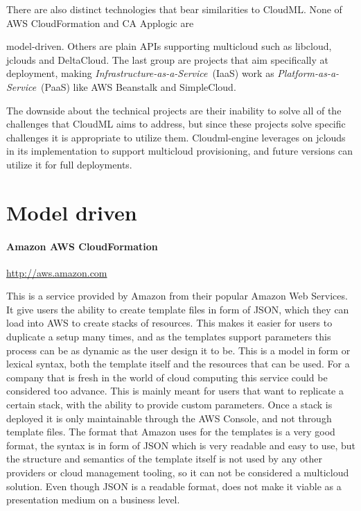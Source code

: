 There are also distinct technologies that bear similarities to CloudML.
None of AWS CloudFormation and CA Applogic are \begin{ii}\iitem model-driven.
Others are plain APIs supporting \iitem multicloud such as libcloud, jclouds and DeltaCloud.
The last group are projects that aim specifically at deployment, 
making \emph{Infrastructure-as-a-Service}~(IaaS) work as \emph{Platform-as-a-Service}~(PaaS)
like AWS Beanstalk and SimpleCloud.\end{ii}
The downside about the technical projects are their inability to solve all of the challenges
that CloudML aims to address, but since these projects solve specific
challenges it is appropriate to utilize them.
Cloudml-engine leverages on jclouds in its implementation to support multicloud provisioning,
and future versions can utilize it for full deployments.

\section{Model driven}

\paragraph{Amazon AWS CloudFormation}
\url{http://aws.amazon.com}

This is a service provided by Amazon from their popular Amazon Web Services. 
It give users the ability to create template files in form of JSON, which they can load into AWS to create stacks of resources. 
This makes it easier for users to duplicate a setup many times, and as the templates support parameters this process 
can be as dynamic as the user design it to be. This is a model in form or lexical syntax, both the template itself and the resources that can be used.
For a company that is fresh in the world of cloud computing this service could be considered too advance. 
This is mainly meant for users that want to replicate a certain stack, with the ability to provide custom parameters. 
Once a stack is deployed it is only maintainable through the AWS Console, and not through template files. 
The format that Amazon uses for the templates is a very good format, the syntax is in form of JSON which is very readable and easy to use, 
but the structure and semantics of the template itself is not used by any other providers or cloud management tooling, 
so it can not be considered a multicloud solution. Even though JSON is a readable format, does not make it viable as a presentation medium on a business level.

